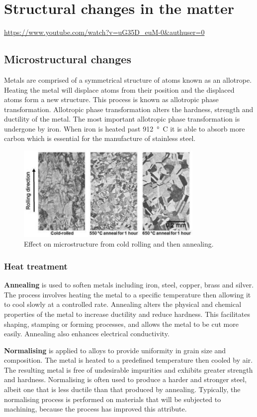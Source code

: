 \section{Structural changes in the matter}
\url{https://www.youtube.com/watch?v=uG35D_euM-0&authuser=0}
\subsection{Microstructural changes}
Metals are comprised of a symmetrical structure of atoms known as an allotrope. Heating the metal will displace atoms from their position and the displaced atoms form a new structure. This process is known as allotropic phase transformation. Allotropic phase transformation alters the hardness, strength and ductility of the metal. The most important allotropic phase transformation is undergone by iron. When iron is heated past \SI{912}{\degree C} it is able to absorb more carbon which is essential for the manufacture of stainless steel.
\begin{figure}[H]
    \centering
    \includegraphics[width = 0.8\textwidth]{img/figure43.png}
    \caption{Effect on microstructure from cold rolling and then annealing.}
\end{figure}
\subsubsection{Heat treatment}
\textbf{Annealing} is used to soften metals including iron, steel, copper, brass and silver. The process involves heating the metal to a specific temperature then allowing it to cool slowly at a controlled rate. Annealing alters the physical and chemical properties of the metal to increase ductility and reduce hardness. This facilitates shaping, stamping or forming processes, and allows the metal to be cut more easily. Annealing also enhances electrical conductivity.

\textbf{Normalising} is applied to alloys to provide uniformity in grain size and composition. The metal is heated to a predefined temperature then cooled by air. The resulting metal is free of undesirable impurities and exhibits greater strength and hardness. Normalising is often used to produce a harder and stronger steel, albeit one that is less ductile than that produced by annealing. Typically, the normalising process is performed on materials that will be subjected to machining, because the process has improved this attribute.

